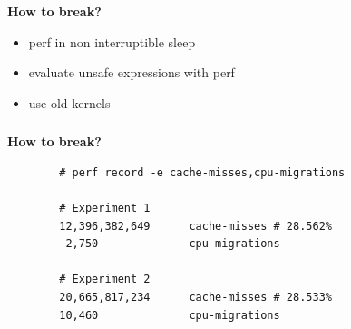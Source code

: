 \documentclass[usenames,dvipsnames, 18pt, compress, aspectratio=169]{beamer}
\begin{document}
\begin{frame}[fragile]{}
    \frametitle{}
    \begin{center}
        \textbf{How to break?}

        \begin{itemize}[label={\MVRightarrow}]
            \item <+-> perf in non interruptible sleep
            \item <+-> evaluate unsafe expressions with perf
            \item <+-> use old kernels
        \end{itemize}

    \end{center}
\end{frame}

\begin{frame}[fragile]{}
    \frametitle{}
    \begin{center}
        \textbf{How to break?}

        \begin{verbatim}
        # perf record -e cache-misses,cpu-migrations

        # Experiment 1
        12,396,382,649      cache-misses # 28.562%
         2,750              cpu-migrations

        # Experiment 2
        20,665,817,234      cache-misses # 28.533%
        10,460              cpu-migrations
        \end{verbatim}

    \end{center}
\end{frame}
\end{document}
